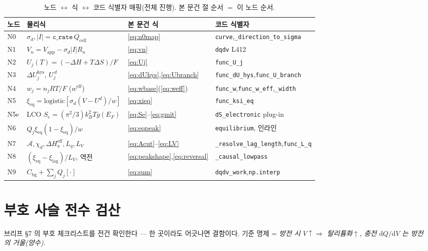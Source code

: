 \documentclass[11pt,a4paper]{article}
\newcommand{\dd}{\mathrm{d}}
\newcommand{\eff}{\mathrm{eff}}
\newcommand{\eq}{\mathrm{eq}}
\newcommand{\app}{\mathrm{app}}
\newcommand{\cell}{\mathrm{cell}}
\newcommand{\bg}{\mathrm{bg}}
\newcommand{\hys}{\mathrm{hys}}
\newcommand{\code}[1]{\texttt{#1}}
\begin{document}
\begin{table}[t]
\centering
\renewcommand{\arraystretch}{1.3}
\caption{노드 $\leftrightarrow$ 식 $\leftrightarrow$ 코드 식별자 매핑(전체 진행). 본 문건 절 순서 $=$ 이 노드 순서.}
\label{tab:nodemap}
\begin{tabular}{l l l l}
\toprule
노드 & 물리식 & 본 문건 식 & 코드 식별자 \\
\midrule
N0 & $\sigma_d,|I|=\code{c\_rate}\,Q_\cell$ & \eqref{eq:n0map} & \code{curve},\code{\_direction\_to\_sigma} \\
N1 & $V_n=V_\app-\sigma_d|I|R_n$ & \eqref{eq:vn} & \code{dqdv} L412 \\
N2 & $U_j(T)=(-\Delta H+T\Delta S)/F$ & \eqref{eq:Uj} & \code{func\_U\_j} \\
N3 & $\Delta U_j^\hys$, $U_j^{\,d}$ & \eqref{eq:dUhys},\eqref{eq:Ubranch} & \code{func\_dU\_hys},\code{func\_U\_branch} \\
N4 & $w_j=n_jRT/F$ ($w^\eff$) & \eqref{eq:wbase}(\eqref{eq:weff}) & \code{func\_w},\code{func\_w\_eff},\code{\_width} \\
N5 & $\xi_\eq=\mathrm{logistic}[\sigma_d(V-U^d)/w]$ & \eqref{eq:xieq} & \code{func\_ksi\_eq} \\
N5e & LCO $S_e=(\pi^2/3)k_B^2Tg(E_F)$ & \eqref{eq:Se}--\eqref{eq:gmit} & \code{dS\_electronic} plug-in \\
N6 & $Q_j\xi_\eq(1-\xi_\eq)/w$ & \eqref{eq:eqpeak} & \code{equilibrium}, 인라인 \\
N7 & $\mathcal A,\chi_d,\Delta H_a^\eff,L_q,L_V$ & \eqref{eq:Acut}--\eqref{eq:LV} & \code{\_resolve\_lag\_length},\code{func\_L\_q} \\
N8 & $(\xi_\eq-\xi_\mathrm{lag})/L_V$, 역전 & \eqref{eq:peakshape},\eqref{eq:reversal} & \code{\_causal\_lowpass} \\
N9 & $C_\bg+\sum_jQ_j[\cdot]$ & \eqref{eq:sum} & \code{dqdv\_work},\code{np.interp} \\
\bottomrule
\end{tabular}
\end{table}

\section{부호 사슬 전수 검산}\label{sec:signcheck}
브리프 §7 의 부호 체크리스트를 전건 확인한다 — 한 곳이라도 어긋나면 결함이다. 기준 명제 = \emph{방전 시
$V\!\uparrow\Rightarrow$ 탈리튬화$\uparrow$, 충전 $\dd Q/\dd V$ 는 방전의 거울(양수)}.
\end{document}
